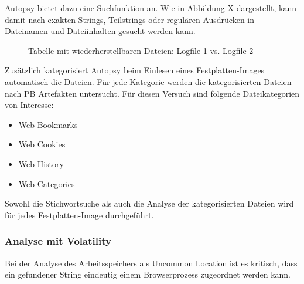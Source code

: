 Autopsy bietet dazu eine Suchfunktion an. Wie in Abbildung X dargestellt, kann damit nach exakten Strings, Teilstrings oder regulären Ausdrücken in Dateinamen und Dateiinhalten gesucht werden kann.

\begin{figure}[h!]
	\caption{Tabelle mit wiederherstellbaren Dateien: Logfile 1 vs. Logfile 2}
\end{figure}

Zusätzlich kategorisiert Autopsy beim Einlesen eines Festplatten-Images automatisch die Dateien. Für jede Kategorie werden die kategorisierten Dateien nach PB Artefakten untersucht. Für diesen Versuch sind folgende Dateikategorien von Interesse:
\begin{itemize}
\item Web Bookmarks
\item Web Cookies
\item Web History
\item Web Categories
\end{itemize}

Sowohl die Stichwortsuche als auch die Analyse der kategorisierten Dateien wird für jedes Festplatten-Image durchgeführt.

\subsubsection*{Analyse mit Volatility}

Bei der Analyse des Arbeitsspeichers als Uncommon Location ist es kritisch, dass ein gefundener String eindeutig einem Browserprozess zugeordnet werden kann. 

